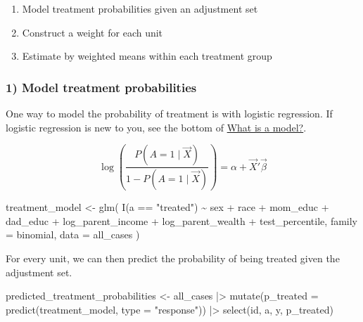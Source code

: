 \documentclass[
  letterpaper,
  DIV=11,
  numbers=noendperiod]{scrartcl}
\newenvironment{Shaded}{\begin{snugshade}}{\end{snugshade}}
\newcommand{\AttributeTok}[1]{\textcolor[rgb]{0.40,0.45,0.13}{#1}}
\newcommand{\FunctionTok}[1]{\textcolor[rgb]{0.28,0.35,0.67}{#1}}
\newcommand{\NormalTok}[1]{\textcolor[rgb]{0.00,0.23,0.31}{#1}}
\newcommand{\OtherTok}[1]{\textcolor[rgb]{0.00,0.23,0.31}{#1}}
\newcommand{\SpecialCharTok}[1]{\textcolor[rgb]{0.37,0.37,0.37}{#1}}
\newcommand{\StringTok}[1]{\textcolor[rgb]{0.13,0.47,0.30}{#1}}
\providecommand{\tightlist}{%
  \setlength{\itemsep}{0pt}\setlength{\parskip}{0pt}}\usepackage{longtable,booktabs,array}
\begin{document}
\begin{enumerate}
\def\labelenumi{\arabic{enumi})}
\tightlist
\item
  Model treatment probabilities given an adjustment set
\item
  Construct a weight for each unit
\item
  Estimate by weighted means within each treatment group
\end{enumerate}

\subsubsection{1) Model treatment
probabilities}\label{model-treatment-probabilities}

One way to model the probability of treatment is with logistic
regression. If logistic regression is new to you, see the bottom of
\href{what_is_a_model.qmd}{What is a model?}.

\[
\log\left(\frac{P(A = 1 \mid\vec{X})}{1-P(A = 1\mid\vec{X})}\right) = \alpha + \vec{X}'\vec\beta
\]

\begin{Shaded}
\begin{Highlighting}[]
\NormalTok{treatment\_model }\OtherTok{\textless{}{-}} \FunctionTok{glm}\NormalTok{(}
  \FunctionTok{I}\NormalTok{(a }\SpecialCharTok{==} \StringTok{"treated"}\NormalTok{) }\SpecialCharTok{\textasciitilde{}}\NormalTok{ sex }\SpecialCharTok{+}\NormalTok{ race }\SpecialCharTok{+}\NormalTok{ mom\_educ }\SpecialCharTok{+}\NormalTok{ dad\_educ }\SpecialCharTok{+}\NormalTok{ log\_parent\_income }\SpecialCharTok{+}
\NormalTok{    log\_parent\_wealth }\SpecialCharTok{+}\NormalTok{ test\_percentile,}
  \AttributeTok{family =}\NormalTok{ binomial,}
  \AttributeTok{data =}\NormalTok{ all\_cases}
\NormalTok{)}
\end{Highlighting}
\end{Shaded}

For every unit, we can then predict the probability of being treated
given the adjustment set.

\begin{Shaded}
\begin{Highlighting}[]
\NormalTok{predicted\_treatment\_probabilities }\OtherTok{\textless{}{-}}\NormalTok{ all\_cases }\SpecialCharTok{|\textgreater{}}
  \FunctionTok{mutate}\NormalTok{(}\AttributeTok{p\_treated =} \FunctionTok{predict}\NormalTok{(treatment\_model, }\AttributeTok{type =} \StringTok{"response"}\NormalTok{)) }\SpecialCharTok{|\textgreater{}}
  \FunctionTok{select}\NormalTok{(id, a, y, p\_treated)}
\end{Highlighting}
\end{Shaded}
\end{document}

